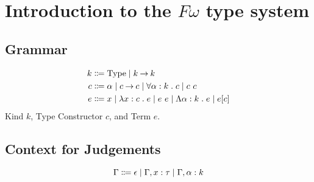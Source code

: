 \newpage
\section{Introduction to the $F\omega$ type system}


\begin{grouped}{\subsection{Grammar}}
\begin{align*}
k & \mathrel{\Coloneqq} \operatorname{Type} \mathrel{\mid} k \mathbin{\rightarrow} k \\
c & \mathrel{\Coloneqq} \alpha \mathrel{\mid} c \mathbin{\rightarrow} c \mathrel{\mid} \forall \alpha \mathrel{:} k\mathrel{.} c \mathrel{\mid} c\ c \\
e & \mathrel{\Coloneqq} x \mathrel{\mid} \lambda x \mathrel{:} c\mathrel{.} e \mathrel{\mid} e\ e
    \mathrel{\mid} \Lambda \alpha \mathrel{:} k\mathrel{.} e \mathrel{\mid} e [ c ] \\
\end{align*}
Kind $k$, Type Constructor $c$, and Term $e$.\\
\end{grouped}

\begin{grouped}{\subsection{Context for Judgements}}
\begin{equation} \label{Context}
\Gamma \mathrel{\Coloneqq} \epsilon \mathrel{\mid} \Gamma, x \mathrel{:} \tau \mathrel{\mid} \Gamma, \alpha \mathrel{:} k
\end{equation}
\end{grouped}

